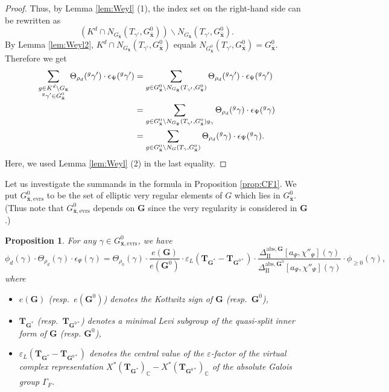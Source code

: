 \documentclass{amsart}
\newcommand{\abs}{\mathrm{abs}}
\newcommand{\evrs}{\mathrm{evrs}}
\newcommand{\bfT}{\mathbf{T}}
\newcommand{\x}{\mathbf{x}}
\newcommand{\C}{\mathbb{C}}
\newcommand{\bfG}{\mathbf{G}}
\newcommand{\II}{\mathrm{II}}
\theoremstyle{plain}
\newtheorem{prop}[thm]{Proposition}
\theoremstyle{definition}
\theoremstyle{remark}
\theoremstyle{theorem}
\begin{document}
\begin{proof}
Thus, by Lemma \ref{lem:Weyl} (1), the index set on the right-hand side can be rewritten as 
\[
(K^{d}\cap N_{G_{\bar{\x}}}(T_{\gamma'},G^{0}_{\bar{\x}}))\backslash N_{G_{\bar{\x}}}(T_{\gamma'},G^{0}_{\bar{\x}}).
\]
By Lemma \ref{lem:Weyl2}, $K^{d}\cap N_{G_{\bar{\x}}}(T_{\gamma'},G^{0}_{\bar{\x}})$ equals $N_{G^{0}_{\bar{\x}}}(T_{\gamma'},G^{0}_{\bar{\x}})=G^{0}_{\bar{\x}}$.
Therefore we get
\begin{align*}
\sum_{\begin{subarray}{c}g \in K^{d}\backslash G_{\bar{\x}} \\  {}^{g}\gamma'\in G^{0}_{\bar{\x}}\end{subarray}}
\Theta_{\rho_{d}}({}^{g}\gamma')\cdot\epsilon_{\Psi}({}^{g}\gamma')
&=
\sum_{g\in G^{0}_{\bar{\x}}\backslash N_{G_{\bar{\x}}}(T_{\gamma'},G^{0}_{\bar{\x}})}
\Theta_{\rho_{d}}({}^{g}\gamma')\cdot\epsilon_{\Psi}({}^{g}\gamma')\\
&=
\sum_{g\in G^{0}_{\bar{\x}}\backslash N_{G_{\bar{\x}}}(T_{\gamma'},G^{0}_{\bar{\x}})g_{\gamma}}
\Theta_{\rho_{d}}({}^{g}\gamma)\cdot\epsilon_{\Psi}({}^{g}\gamma)\\
&=
\sum_{g\in G^{0}_{\bar{\x}}\backslash N_{G}(T_{\gamma},G^{0}_{\bar{\x}})}
\Theta_{\rho_{d}}({}^{g}\gamma)\cdot\epsilon_{\Psi}({}^{g}\gamma).
\end{align*}
Here, we used Lemma \ref{lem:Weyl} (2) in the last equality.
\end{proof}

Let us investigate the summands in the formula in Proposition \ref{prop:CF1}.
We put $G^{0}_{\bar{\x},\evrs}$ to be the set of elliptic very regular elements of $G$ which lies in $G^{0}_{\bar{\x}}$.
(Thus note that $G^{0}_{\bar{\x},\evrs}$ depends on $\bfG$ since the very regularity is considered in $\bfG$.)

\begin{prop}\label{prop:CF2}
For any $\gamma\in G^{0}_{\bar{\x},\evrs}$, we have
\[
\phi_{d}(\gamma)\cdot\Theta_{\rho_{d}}(\gamma)\cdot\epsilon_{\Psi}(\gamma)
=
\Theta_{\rho_{0}}(\gamma)\cdot\frac{e(\bfG)}{e(\bfG^{0})}\cdot \varepsilon_{L}(\bfT_{\bfG^{\ast}}-\bfT_{\bfG^{0\ast}})\cdot\frac{\Delta_{\II}^{\abs,\bfG}[a_{\Psi},\chi''_{\Psi}](\gamma)}{\Delta_{\II}^{\abs,\bfG^{0}}[a_{\Psi},\chi''_{\Psi}](\gamma)}\cdot\phi_{\geq0}(\gamma),
\]
where 
\begin{itemize}
\item
$e(\bfG)$ (resp.\ $e(\bfG^{0})$) denotes the Kottwitz sign of $\bfG$ (resp.\ $\bfG^{0}$), 
\item
$\bfT_{\bfG^{\ast}}$ (resp.\ $\bfT_{\bfG^{0\ast}}$) denotes a minimal Levi subgroup of the quasi-split inner form of $\bfG$ (resp. $\bfG^{0}$),
\item
$\varepsilon_{L}(\bfT_{\bfG^{\ast}}-\bfT_{\bfG^{0\ast}})$ denotes the central value of the $\varepsilon$-factor of the virtual complex representation $X^{\ast}(\bfT_{\bfG^{\ast}})_{\C}-X^{\ast}(\bfT_{\bfG^{0\ast}})_{\C}$ of the absolute Galois group $\Gamma_{F}$.
\end{itemize}
\end{prop}
\end{document}
